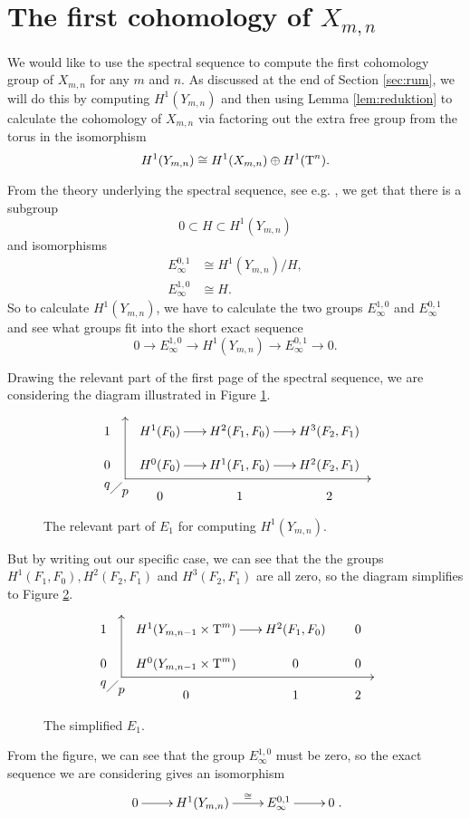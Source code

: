 \section{The first cohomology of $X_{m,n}$}
\label{sec:firstcohom}

We would like to use the spectral sequence to compute the first
cohomology group of $X_{m,n}$ for any $m$ and $n$. As discussed at the
end of Section \ref{sec:rum}, we will do this by computing
$H^1(Y_{m,n})$ and
then using Lemma \ref{lem:reduktion} to calculate the cohomology of
$X_{m,n}$ via factoring out the extra free group from the torus
in the isomorphism
\[ H^1(Y_{m,n}) \cong H^1(X_{m,n}) \oplus H^1(\operatorname{T}^n). \]

From the theory
underlying the spectral sequence, see e.g. \cite[Chapter
1]{hatcherss}, we get that there is a subgroup
\[ 0 \subset H \subset H^1(Y_{m,n}) \]
and isomorphisms
\begin{align*}
  E_\infty^{0,1} &\cong H^1(Y_{m,n})/H, \\
  E_\infty^{1,0} &\cong H.
\end{align*}
So to calculate $H^1(Y_{m,n})$, we have to calculate the two groups
$E_\infty^{1,0}$ and $E_\infty^{0,1}$ and see what groups fit
into the short exact sequence
\[ 0 \to E^{1,0}_\infty \to H^1(Y_{m,n}) \to E^{0,1}_\infty \to 0. \]

Drawing the relevant part of the first page of the spectral sequence,
we are considering the diagram illustrated in Figure
\ref{fig:foerste}.
\begin{figure}[ht]
  \[ \xy
  (5,4); (5,-13); **\dir{-}; (5,4); *\dir{>};
  (5,-13); (73,-13); **\dir{-}; *\dir{<};
  (0,-15)*{q}; (5,-17)*{p};
  (1,-17); (4,-14); **\dir{-};
  (0,0)\xymatrix@R=1em@C=1.7em{
    1 & H^1(F_0) \ar[r]& H^2(F_1,F_0) \ar[r] & H^3(F_2,F_1) \\
    0 & H^0(F_0) \ar[r] & H^1(F_1,F_0) \ar[r] & H^2(F_2,F_1) \\
    & 0 & 1 & 2
  } \endxy \]
  \caption{The relevant part of $E_1$ for computing $H^1(Y_{m,n})$.}
  \label{fig:foerste}
\end{figure}
But by writing out our specific case, we can see that the the groups
$H^1(F_1,F_0), H^2(F_2,F_1)$ and $H^3(F_2,F_1)$ are all zero, so the
diagram simplifies to Figure \ref{fig:anden}. 
\begin{figure}[ht]
  \[ \xy
  (5,4); (5,-13); **\dir{-}; (5,4); *\dir{>};
  (5,-13); (75,-13); **\dir{-}; *\dir{<};
  (0,-15)*{q}; (5,-17)*{p};
  (1,-17); (4,-14); **\dir{-};
  (0,0)\xymatrix@R=1em@C=1.7em{
    1 & H^1(Y_{m,n-1}\times \T^m) \ar[r]& H^2(F_1,F_0) & 0 \\
    0 & H^0(Y_{m,n-1}\times \T^{m}) & 0 & 0 \\
    & 0 & 1 & 2
  } \endxy \]
  \caption{The simplified $E_1$.}
  \label{fig:anden}
\end{figure}
From the figure, we can see that the group $E_\infty^{1,0}$
must be zero, so the exact sequence we are considering gives an
isomorphism
\[ \xymatrix{0 \ar[r] & H^1(Y_{m,n}) \ar[r]^>>>>>{\cong} & E^{0,1}_\infty
  \ar[r] & 0}. \]


